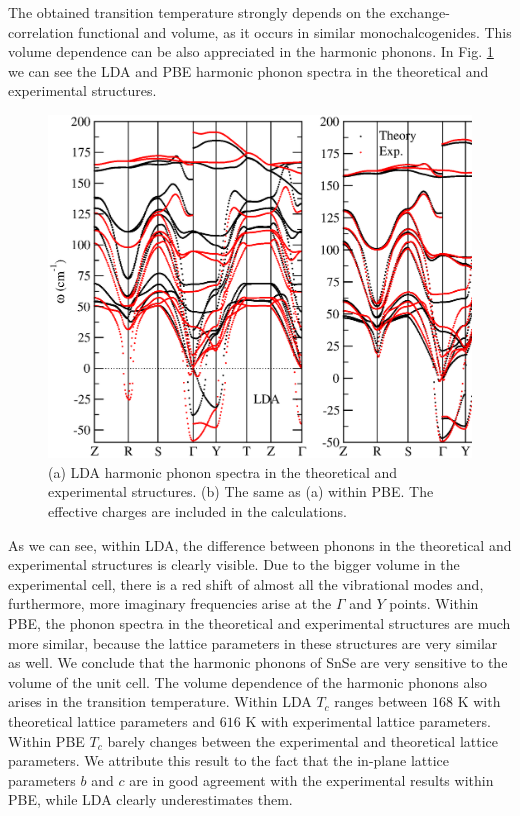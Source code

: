 The obtained transition temperature strongly depends on the exchange-correlation functional and volume, as it occurs 
in similar monochalcogenides\cite{ribeiro2018strong}. This volume dependence can be also appreciated in the harmonic 
phonons. In Fig. \ref{harmonic-volume} we can see the LDA and PBE harmonic phonon spectra in the theoretical and 
experimental structures.
\begin{figure}[th]
\begin{center}
\includegraphics[width=0.9\linewidth]{Figures/phonon-exp-dft.eps}
	\caption[Harmonic phonons of $Cmcm$ SnSe with different volumes.]{(a) LDA harmonic phonon spectra in the 
	theoretical and experimental structures. (b) The same as (a) within PBE. The effective charges are included 
	in the calculations.}
\label{harmonic-volume}
\end{center}
\end{figure}
As we can see, within LDA, the difference between phonons in the theoretical and experimental structures is clearly
visible. Due to the bigger volume in the experimental cell, there is a red shift of almost all the vibrational modes
and, furthermore, more imaginary frequencies arise at the $\Gamma$ and $Y$ points. Within PBE, the phonon spectra in
the theoretical and experimental structures are much more similar, because the lattice parameters in these structures
are very similar as well. We conclude that the harmonic phonons of SnSe are very sensitive to the volume of the unit 
cell. The volume dependence of the harmonic phonons also arises in the transition temperature. Within LDA $T_{c}$ 
ranges between $168$ K with theoretical lattice parameters and $616$ K with experimental lattice parameters. Within 
PBE $T_{c}$ barely changes between the experimental and theoretical lattice parameters. We attribute this result to 
the fact that the in-plane lattice parameters $b$ and $c$ are in good agreement with the experimental results within 
PBE, while LDA clearly underestimates them. \\

